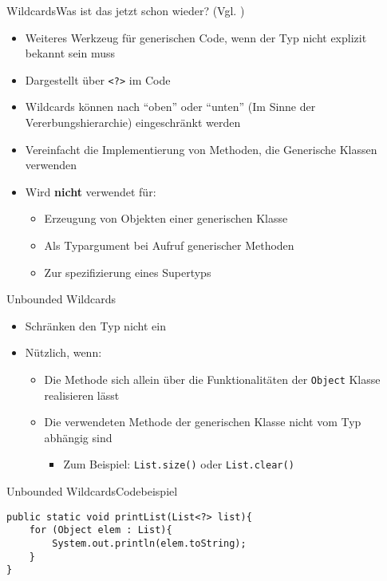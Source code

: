 \begin{frame}{Wildcards}{Was ist das jetzt schon wieder? (Vgl. \cite{orac:wildcard})}
    \begin{itemize}
        \item Weiteres Werkzeug für generischen Code, wenn der Typ nicht explizit bekannt sein muss
        \item Dargestellt über \texttt{<?>} im Code
        \item Wildcards können nach "`oben"' oder "`unten"' (Im Sinne der Vererbungshierarchie) eingeschränkt werden
        \item Vereinfacht die Implementierung von Methoden, die Generische Klassen verwenden
        \item Wird \textbf{nicht} verwendet für:
        \begin{itemize}
            \item Erzeugung von Objekten einer generischen Klasse
            \item Als Typargument bei Aufruf generischer Methoden
            \item Zur spezifizierung eines Supertyps
        \end{itemize}
    \end{itemize}
\end{frame}

\begin{frame}{Unbounded Wildcards}
    \begin{itemize}
        \item Schränken den Typ nicht ein
        \item Nützlich, wenn:
        \begin{itemize}
            \item Die Methode sich allein über die Funktionalitäten der \texttt{Object} Klasse realisieren lässt
            \item Die verwendeten Methode der generischen Klasse nicht vom Typ abhängig sind
            \begin{itemize}
                \item Zum Beispiel: \texttt{List.size()} oder \texttt{List.clear()}
            \end{itemize}
        \end{itemize}
    \end{itemize}
\end{frame}

\begin{frame}[fragile]{Unbounded Wildcards}{Codebeispiel}
\lstset{style=java}
\begin{lstlisting}
public static void printList(List<?> list){
    for (Object elem : List){
        System.out.println(elem.toString);
    }
}
\end{lstlisting}
\end{frame}

